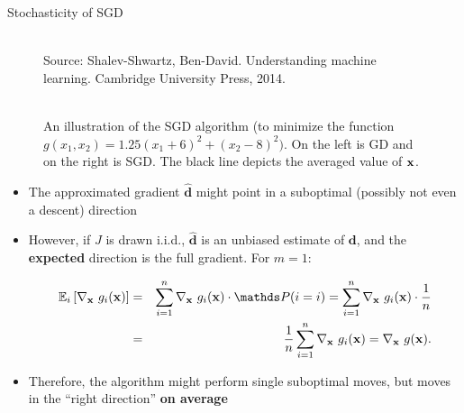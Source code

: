 \documentclass[11pt,compress,t,notes=noshow, xcolor=table]{beamer}
\begin{document}
\begin{vbframe}{Stochasticity of SGD}

	
	\vspace*{0.2cm}

	\begin{figure}
		\begin{tiny}\\ 
		Source: Shalev-Shwartz, Ben-David. Understanding machine learning. Cambridge University Press, 2014. 
		\end{tiny}\\
		An illustration of the SGD algorithm (to minimize the function $g(x_1, x_2) = 1.25(x_1 + 6)^2 + (x_2 - 8)^2)$. On the left is GD and on the right is SGD. The black line depicts the averaged value of $\mathbf{x}$.
	\end{figure}

	\framebreak 

	\begin{itemize}

		\item The approximated gradient $\bm{\hat d}$ might point in a suboptimal (possibly not even a descent) direction
		\item However, if $J$ is drawn i.i.d., $\bm{\hat d}$ is an unbiased estimate of $\bm{d}$, and the \textbf{expected} direction is the full gradient. For $m = 1$: 

		\vspace*{-0.5cm}

		\begin{eqnarray*}
			\mathbb{E}_{i}\left[\nabla_\xv ~g_i(\xv)\right] &=&\sumin \nabla_\xv ~g_i(\xv) \cdot \P(i = i) = \sumin \nabla_\xv ~ g_i(\xv) \cdot \frac{1}{n}\\ &=& \frac{1}{n} \sumin \nabla_\xv~g_i(\xv) = \nabla_\xv~ g(\xv).
		\end{eqnarray*}
		\item Therefore, the algorithm might perform single suboptimal moves, but moves in the \enquote{right direction} \textbf{on average}
	\end{itemize}

\end{vbframe}
\end{document}
